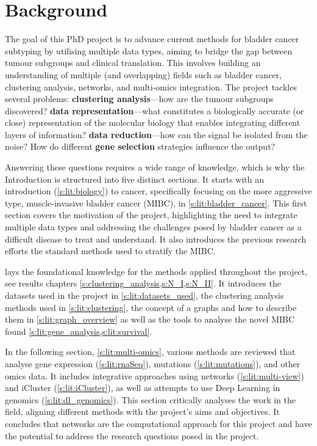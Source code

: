 

\chapter{Background} \label{s:lit_review_intro}


The goal of this PhD project is to advance current methods for bladder cancer subtyping by utilising multiple data types, aiming to bridge the gap between tumour subgroups and clinical translation. This involves building an understanding of multiple (and overlapping) fields such as bladder cancer, clustering analysis, networks, and multi-omics integration. The project tackles several problems: \textbf{clustering analysis}—how are the tumour subgroups discovered? \textbf{data representation}—what constitutes a biologically accurate (or close) representation of the molecular biology that enables integrating different layers of information? \textbf{data reduction}—how can the signal be isolated from the noise? How do different \textbf{gene selection} strategies influence the output?

Answering these questions requires a wide range of knowledge, which is why the Introduction is structured into five distinct sections. It starts with an introduction (\cref{s:lit:biology}) to cancer, specifically focusing on the more aggressive type, muscle-invasive bladder cancer (MIBC), in \cref{s:lit:bladder_cancer}. This first section covers the motivation of the project, highlighting the need to integrate multiple data types and addressing the challenges posed by bladder cancer as a difficult disease to treat and understand. It also introduces the previous research efforts the standard methods used to stratify the MIBC.

 lays the foundational knowledge for the methods applied throughout the project, see results chapters \cref{s:clustering_analysis,s:N_I,s:N_II}. It introduces the datasets used in the project in \cref{s:lit:datasets_used}, the clustering analysis methods used in \cref{s:lit:clustering}, the concept of a graphs and how to describe them in \cref{s:lit:graph_overview} as well as the tools to analyse the novel MIBC found \cref{s:lit:gene_analysis,s:lit:survival}. 


In the following section, \ref{s:lit:multi-omics}, various methods are reviewed that analyse gene expression (\cref{s:lit:rnaSeq}), mutations (\cref{s:lit:mutations}), and other omics data. It includes integrative approaches using networks (\cref{s:lit:multi-view}) and iCluster (\cref{s:lit:iCluster}), as well as attempts to use Deep Learning in genomics (\cref{s:lit:dl_genomics}). This section critically analyses the work in the field, aligning different methods with the project's aims and objectives. It concludes that networks are the computational approach for this project and have the potential to address the research questions posed in the project.

